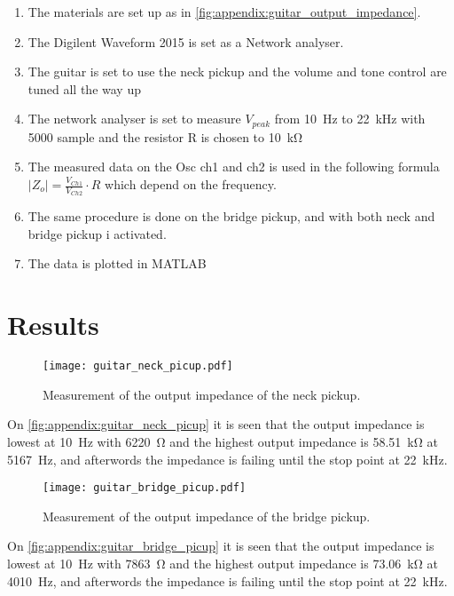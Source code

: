 \begin{enumerate}
\item The materials are set up as in \autoref{fig:appendix:guitar_output_impedance}.
\item The Digilent Waveform 2015 is set as a Network analyser.
\item  The guitar is set to use the neck pickup and the volume and tone control are tuned all the way up
\item  The network analyser is set to measure $V_{peak}$ from \SI{10}{\hertz} to \SI{22}{\kilo\hertz} with 5000 sample and the resistor R is chosen to \SI{10}{\kilo\ohm}
\item The measured data on the Osc ch1 and ch2 is used in the following formula $\left | Z_o \right | = \frac{V_{Ch1}}{V_{Ch2}}\cdot R$ which depend on the frequency. 
\item The same procedure is done on the bridge pickup, and with both neck and bridge pickup i activated.
\item The data is plotted in MATLAB
\end{enumerate}

\section*{Results}

\begin{figure}[htbp!]
	\centering
		\texttt{[image: guitar\_neck\_picup.pdf]}
		\caption{Measurement of the output impedance of the neck pickup.}
		\label{fig:appendix:guitar_neck_picup}
\end{figure}

On \autoref{fig:appendix:guitar_neck_picup} it is seen that the output impedance is lowest at \SI{10}{\hertz} with \SI{6220}{\ohm}  and the highest output impedance is \SI{58,51}{\kilo\ohm} at \SI{5167}{\hertz}, and afterwords the impedance is failing until the stop point at \SI{22}{\kilo\hertz}.

\begin{figure}[htbp!]
	\centering
		\texttt{[image: guitar\_bridge\_picup.pdf]}
		\caption{Measurement of the output impedance of the bridge pickup.}
		\label{fig:appendix:guitar_bridge_picup}
\end{figure}

On  \autoref{fig:appendix:guitar_bridge_picup} it is seen that the output impedance is lowest at \SI{10}{\hertz} with \SI{7863}{\ohm}  and the highest output impedance is \SI{73,06}{\kilo\ohm} at \SI{4010}{\hertz}, and afterwords the impedance is failing until the stop point at \SI{22}{\kilo\hertz}.

